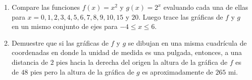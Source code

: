\item 
\begin{enumerate}
    \item[(a)] Compare las funciones $f(x) = x^2$ y $g(x) = 2^x$ evaluando cada una de ellas para $x = 0, 1, 2, 3, 4, 5, 6, 7, 8, 9, 10, 15$ y $20$. Luego trace las gráficas de $f$ y $g$ en un mismo conjunto de ejes para $-4 \le x \le 6$.
    \item[(b)] Demuestre que si las gráficas de $f$ y $g$ se dibujan en una misma cuadrícula de coordenadas en donde la unidad de medida es una pulgada, entonces, a una distancia de $2 \text{ pies}$ hacia la derecha del origen la altura de la gráfica de $f$ es de $48 \text{ pies}$ pero la altura de la gráfica de $g$ es aproximadamente de $265 \text{ mi}$.
\end{enumerate}
